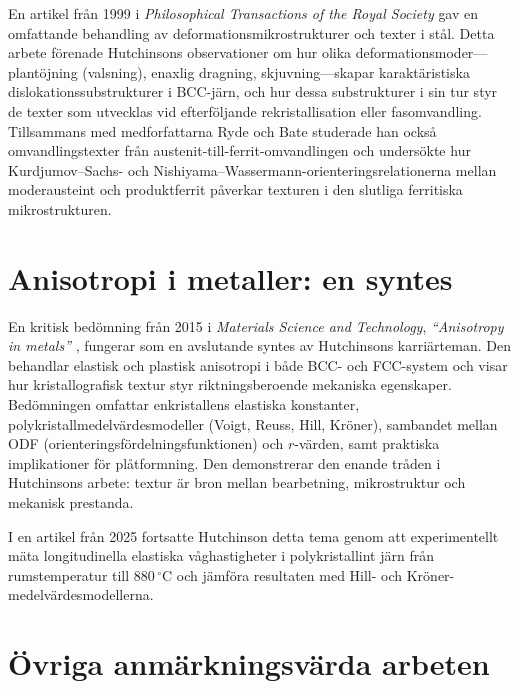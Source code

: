 \documentclass[11pt,a4paper]{article}
\begin{document}
En artikel fr\aa{}n 1999 i \emph{Philosophical Transactions of the Royal
Society} \cite{Hutchinson1999Phil} gav en omfattande behandling av
deformationsmikrostrukturer och texter i st\aa{}l.  Detta arbete
f\"orenade Hutchinsons observationer om hur olika
deformationsmoder---plant\"ojning (valsning), enaxlig dragning,
skjuvning---skapar karakt\"aristiska dislokationssubstrukturer i
BCC-j\"arn, och hur dessa substrukturer i sin tur styr de texter som
utvecklas vid efterf\"oljande rekristallisation eller fasomvandling.
Tillsammans med medforfattarna Ryde och Bate studerade han ocks\aa{}
omvandlingstexter fr\aa{}n austenit-till-ferrit-omvandlingen och
unders\"okte hur Kurdjumov--Sachs- och
Nishiyama--Wassermann-orienteringsrelationerna mellan moderausteint och
produktferrit p\aa{}verkar texturen i den slutliga ferritiska
mikrostrukturen.

\section{Anisotropi i metaller: en syntes}
\label{sec:anisotropy}

En kritisk bed\"omning fr\aa{}n 2015 i \emph{Materials Science and
Technology}, \emph{``Anisotropy in metals''} \cite{Hutchinson2015},
fungerar som en avslutande syntes av Hutchinsons karri\"arteman.  Den
behandlar elastisk och plastisk anisotropi i b\aa{}de BCC- och
FCC-system och visar hur kristallografisk textur styr riktningsberoende
mekaniska egenskaper.  Bed\"omningen omfattar enkristallens elastiska
konstanter, polykristallmedelvärdesmodeller (Voigt, Reuss, Hill,
Kr\"oner), sambandet mellan ODF (orienteringsf\"ordelningsfunktionen) och
$r$-v\"arden, samt praktiska implikationer f\"or pl\aa{}tformning.  Den
demonstrerar den enande tr\aa{}den i Hutchinsons arbete: textur \"ar bron
mellan bearbetning, mikrostruktur och mekanisk prestanda.

I en artikel fr\aa{}n 2025 \cite{Hutchinson2025pssb} fortsatte
Hutchinson detta tema genom att experimentellt m\"ata longitudinella
elastiska v\aa{}ghastigheter i polykristallint j\"arn fr\aa{}n
rumstemperatur till $880\,{}^\circ\mathrm{C}$ och j\"amf\"ora
resultaten med Hill- och Kr\"oner-medelvärdesmodellerna.

\section{\"Ovriga anm\"arkningsv\"arda arbeten}
\label{sec:other}
\end{document}
